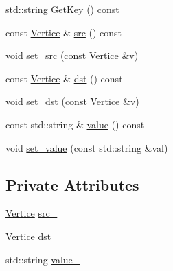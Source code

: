 \begin{DoxyCompactItemize}
\item 
std\-::string \hyperlink{classapollo_1_1cyber_1_1service__discovery_1_1Edge_a961a34ace9c4aad924a6efe30865a502}{Get\-Key} () const 
\item 
const \hyperlink{classapollo_1_1cyber_1_1service__discovery_1_1Vertice}{Vertice} \& \hyperlink{classapollo_1_1cyber_1_1service__discovery_1_1Edge_a52a73f7576ac8f0a7a23ac58afe53da5}{src} () const 
\item 
void \hyperlink{classapollo_1_1cyber_1_1service__discovery_1_1Edge_a1f57d16e2c9297616540fff6e6d85478}{set\-\_\-src} (const \hyperlink{classapollo_1_1cyber_1_1service__discovery_1_1Vertice}{Vertice} \&v)
\item 
const \hyperlink{classapollo_1_1cyber_1_1service__discovery_1_1Vertice}{Vertice} \& \hyperlink{classapollo_1_1cyber_1_1service__discovery_1_1Edge_a79e5638ded81cff42d04c2887dc9e3c2}{dst} () const 
\item 
void \hyperlink{classapollo_1_1cyber_1_1service__discovery_1_1Edge_a23cf5957a86947000d8dea946427d7d6}{set\-\_\-dst} (const \hyperlink{classapollo_1_1cyber_1_1service__discovery_1_1Vertice}{Vertice} \&v)
\item 
const std\-::string \& \hyperlink{classapollo_1_1cyber_1_1service__discovery_1_1Edge_acc54dcfa102adc5feec5d8639c6a20d5}{value} () const 
\item 
void \hyperlink{classapollo_1_1cyber_1_1service__discovery_1_1Edge_a0acb9d44d001a8ec407439dd62db9ea3}{set\-\_\-value} (const std\-::string \&val)
\end{DoxyCompactItemize}
\subsection*{Private Attributes}
\begin{DoxyCompactItemize}
\item 
\hyperlink{classapollo_1_1cyber_1_1service__discovery_1_1Vertice}{Vertice} \hyperlink{classapollo_1_1cyber_1_1service__discovery_1_1Edge_a2cb418e47f70d5961d249e7c4ad49e05}{src\-\_\-}
\item 
\hyperlink{classapollo_1_1cyber_1_1service__discovery_1_1Vertice}{Vertice} \hyperlink{classapollo_1_1cyber_1_1service__discovery_1_1Edge_ac1767f0915a805d69f8494562c755d39}{dst\-\_\-}
\item 
std\-::string \hyperlink{classapollo_1_1cyber_1_1service__discovery_1_1Edge_aa9d24a2d7d30ffea77d8dd52b52483a0}{value\-\_\-}
\end{DoxyCompactItemize}



